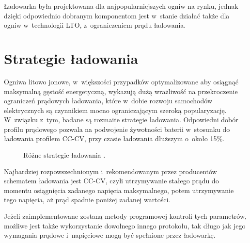 \documentclass[polish,engineer]{polsl-msth}
\begin{document}
Ładowarka była projektowana dla najpopularniejszych ogniw na rynku, jednak dzięki odpowiednio dobranym komponentom jest w~stanie działać także dla ogniw w~technologii LTO, z~ograniczeniem prądu ładowania.

\section{Strategie ładowania}
Ogniwa litowo jonowe, w~większości przypadków optymalizowane aby osiągnąć maksymalną gęstość energetyczną, wykazują dużą wrażliwość na przekroczenie ograniczeń prądowych ładowania\cite{TOMASZEWSKA2019100011}, które w~dobie rozwoju samochodów elektrycznych są czynnikiem mocno ograniczającym szeroką popularyzację. W~związku z~tym, badane są rozmaite strategie ładowania. Odpowiedni dobór profilu prądowego pozwala na podwojenie żywotności baterii w~stosunku do ładowania profilem CC-CV, przy czasie ładowania dłuższym o~około 15\%\cite{SCHINDLER2018364}.
\begin{figure}[hbtp]
     \caption{Różne strategie ładowania \cite{TOMASZEWSKA2019100011}.\label{img:charging_protocols}}
\end{figure}

Najbardziej rozpowszechnionym i~rekomendowanym przez producentów schematem ładowania jest CC-CV, czyli utrzymywanie stałego prądu do momentu osiągnięcia zadanego napięcia maksymalnego, potem utrzymywanie tego napięcia, aż prąd spadnie poniżej zadanej wartości.

Jeżeli zaimplementowane zostaną metody programowej kontroli tych parametrów, możliwe jest także wykorzystanie dowolnego innego protokołu, tak długo jak jego wymagania prądowe i~napięciowe mogą być spełnione przez ładowarkę.
\end{document}
